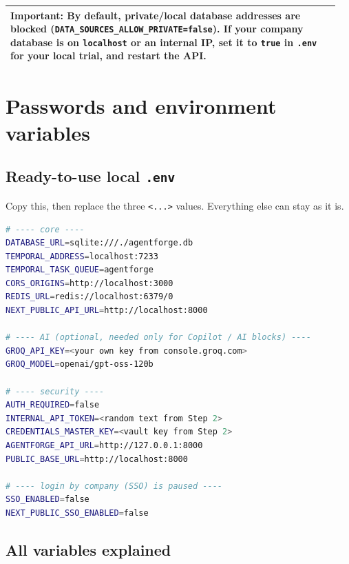 \documentclass[11pt,a4paper]{article}
\newcommand{\env}[1]{\texttt{#1}}
\newenvironment{important}
  {\par\smallskip\noindent\begin{tabular}{|p{0.95\linewidth}|}\hline\rowcolor{noteg}\vspace{2pt}\textbf{Important: }}
  {\vspace{2pt}\\\hline\end{tabular}\par\smallskip}
\begin{document}
\begin{important}
By default, private/local database addresses are blocked
(\env{DATA\_SOURCES\_ALLOW\_PRIVATE=false}). If your company database is on
\texttt{localhost} or an internal IP, set it to \texttt{true} in \texttt{.env} for your
local trial, and restart the API.
\end{important}

\section{Passwords and environment variables}

\subsection{Ready-to-use local \texttt{.env}}

Copy this, then replace the three \texttt{<...>} values. Everything else can stay as it is.

\begin{lstlisting}[language=bash]
# ---- core ----
DATABASE_URL=sqlite:///./agentforge.db
TEMPORAL_ADDRESS=localhost:7233
TEMPORAL_TASK_QUEUE=agentforge
CORS_ORIGINS=http://localhost:3000
REDIS_URL=redis://localhost:6379/0
NEXT_PUBLIC_API_URL=http://localhost:8000

# ---- AI (optional, needed only for Copilot / AI blocks) ----
GROQ_API_KEY=<your own key from console.groq.com>
GROQ_MODEL=openai/gpt-oss-120b

# ---- security ----
AUTH_REQUIRED=false
INTERNAL_API_TOKEN=<random text from Step 2>
CREDENTIALS_MASTER_KEY=<vault key from Step 2>
AGENTFORGE_API_URL=http://127.0.0.1:8000
PUBLIC_BASE_URL=http://localhost:8000

# ---- login by company (SSO) is paused ----
SSO_ENABLED=false
NEXT_PUBLIC_SSO_ENABLED=false
\end{lstlisting}

\subsection{All variables explained}
\end{document}
